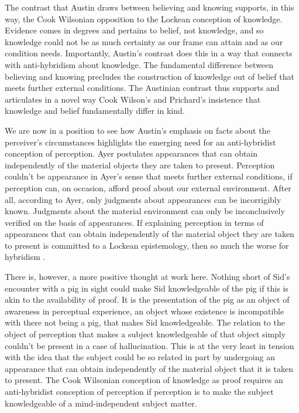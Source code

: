 The contrast that Austin draws between believing and knowing supports, in this way, the Cook Wilsonian opposition to the Lockean conception of knowledge. Evidence comes in degrees and pertains to belief, not knowledge, and so knowledge could not be as much certainty as our frame can attain and as our condition needs. Importantly, Austin's contrast does this in a way that connects with anti-hybridism about knowledge. The fundamental difference between believing and knowing precludes the construction of knowledge out of belief that meets further external conditions. The Austinian contrast thus supports and articulates in a novel way Cook Wilson's and Prichard's insistence that knowledge and belief fundamentally differ in kind.%

We are now in a position to see how Austin's emphasis on facts about the perceiver's circumstances highlights the emerging need for an anti-hybridist conception of perception. Ayer postulates appearances that can obtain independently of the material objects they are taken to present. Perception couldn't be appearance in Ayer's sense that meets further external conditions, if perception can, on occasion, afford proof about our external environment. After all, according to Ayer, only judgments about appearances can be incorrigibly known. Judgments about the material environment can only be inconclusively verified on the basis of appearances. If explaining perception in terms of appearances that can obtain independently of the material object they are taken to present is committed to a Lockean epistemology, then so much the worse for hybridism \citep[see][for a contemporary development of this negative thought]{Putnam:1994kx}. 

There is, however, a more positive thought at work here. Nothing short of Sid's encounter with a pig in sight could make Sid knowledgeable of the pig if this is akin to the availability of proof. It is the presentation of the pig as an object of awareness in perceptual experience, an object whose existence is incompatible with there not being a pig, that makes Sid knowledgeable. The relation to the object of perception that makes a subject knowledgeable of that object simply couldn't be present in a case of hallucination. This is at the very least in tension with the idea that the subject could be so related in part by undergoing an appearance that can obtain independently of the material object that it is taken to present. The Cook Wilsonian conception of knowledge as proof requires an anti-hybridist conception of perception if perception is to make the subject knowledgeable of a mind-independent subject matter. 

